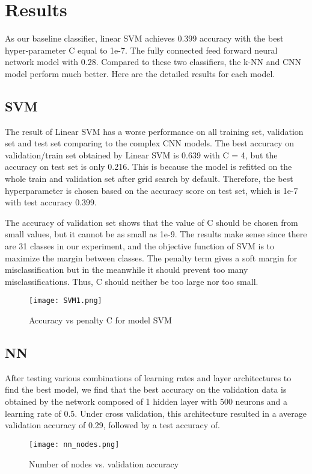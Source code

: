 \documentclass[conference]{IEEEtran}
\begin{document}
\section{Results}

As our baseline classifier, linear SVM achieves 0.399 accuracy with the best hyper-parameter C equal to 1e-7. The fully connected feed forward neural network model with 0.28. Compared to these two classifiers, the k-NN and CNN model perform much better. Here are the detailed results for each model.

\subsection{SVM}
The result of Linear SVM has a worse performance on all training set, validation set and test set comparing to the complex CNN models. The best accuracy on validation/train set obtained by Linear SVM is 0.639 with C = 4, but the accuracy on test set is only 0.216. This is because the model is refitted on the whole train and validation set after grid search by default. Therefore, the best hyperparameter is chosen based on the accuracy score on test set, which is 1e-7 with test accuracy 0.399.

The accuracy of validation set shows that the value of C should be chosen from small values, but it cannot be as small as 1e-9. The results make sense since there are 31 classes in our experiment, and the objective function of SVM is to maximize the margin between classes. The penalty term gives a soft margin for misclassification but in the meanwhile it should prevent too many misclassifications. Thus, C should neither be too large nor too small.
\begin{figure}[!htbp]
\centering
\texttt{[image: SVM1.png]}
\caption{Accuracy vs penalty C for model SVM}
\end{figure}

\subsection{NN}
After testing various combinations of learning rates and layer architectures to find the best model, we find that the best accuracy on the validation data is obtained by the network composed of 1 hidden layer with 500 neurons and a learning rate of 0.5. Under cross validation, this architecture resulted in a average validation accuracy of 0.29, followed by a test accuracy of.
\begin{figure}[!htbp]
\centering
\texttt{[image: nn\_nodes.png]}
\caption{Number of nodes vs. validation accuracy}
\end{figure}
\end{document}
